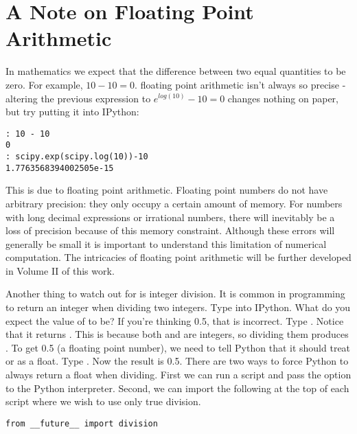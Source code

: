 \section*{A Note on Floating Point Arithmetic}
In mathematics we expect that the difference between two equal quantities to be zero.  For example, $10 - 10 = 0$.  floating point arithmetic isn't always so precise - altering the previous expression to $e^{log(10)} - 10 = 0$ changes nothing on paper, but try putting it into IPython:

\begin{lstlisting}
: 10 - 10
0
: scipy.exp(scipy.log(10))-10
1.7763568394002505e-15
\end{lstlisting}

This is due to floating point arithmetic. Floating point numbers do not have arbitrary precision: they only occupy a certain amount of memory.  For numbers with long decimal expressions or irrational numbers, there will inevitably be a loss of precision because of this memory constraint.  Although these errors will generally be small it is important to understand this limitation of numerical computation. The intricacies of floating point arithmetic will be further developed in Volume II of this work.

Another thing to watch out for is integer division.  It is common in programming to return an integer when dividing two integers.  Type  into IPython.  What do you expect the value of  to be?  If you're thinking 0.5, that is incorrect.  Type .  Notice that it returns .  This is because both  and  are integers, so dividing them produces .  To get 0.5 (a floating point number), we need to tell Python that it should treat  or  as a float.  Type .  Now the result is 0.5.
There are two ways to force Python to always return a float when dividing.  First we can run a script and pass the  option to the Python interpreter.  Second, we can import the following at the top of each script where we wish to use only true division.
\begin{lstlisting}
from __future__ import division
\end{lstlisting}


